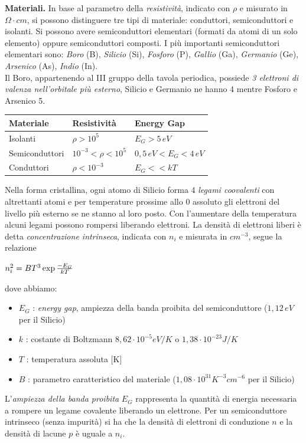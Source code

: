 \documentclass[a4paper,portrait,12pt]{article}
\theoremstyle{definition}
\begin{document}
\textbf{Materiali.} In base al parametro della \textit{resistività}, indicato con
$\rho$ e misurato in $\Omega \cdot cm$, si possono distinguere tre tipi di materiale: conduttori, 
semiconduttori e isolanti.
Si possono avere semiconduttori elementari (formati da atomi di un solo elemento) oppure semiconduttori 
composti. I più importanti semiconduttori elementari sono:
\textit{Boro} (B), \textit{Silicio} (Si), \textit{Fosforo} (P), \textit{Gallio} (Ga), \textit{Germanio} 
(Ge), \textit{Arsenico} (As), \textit{Indio} (In).\\Il Boro, appartenendo al III gruppo della tavola 
periodica, possiede \textit{3 elettroni di valenza nell'orbitale più esterno}, Silicio e Germanio ne 
hanno 4 mentre Fosforo e Arsenico 5.

\begin{table}[H]
\begin{center}
\begin{tabular}{|l|l|l|}
\hline
\hline Materiale & Resistività & Energy Gap\\
\hline 
\hline Isolanti & $\rho > 10^5$ & $E_G > 5\,eV$\\
\hline Semiconduttori & $ 10^{-3} < \rho < 10^5 $ & $ 0,5\,eV < E_G < 4\,eV$\\
\hline Conduttori & $ \rho < 10^{-3}$ & $E_G << kT$\\
\hline
\end{tabular}
\end{center}
\end{table} 

Nella forma cristallina, ogni atomo di Silicio forma 4 \textit{legami coovalenti} con altrettanti atomi e 
per temperature prossime allo 0 assoluto gli elettroni del livello più esterno se ne stanno al loro posto. 
Con l'aumentare della temperatura alcuni legami possono rompersi liberando elettroni. La densità di 
elettroni liberi è detta
\textit{concentrazione intrinseca}, indicata con $n_i$ e misurata in $cm^{-3}$, segue la relazione
\begin{center}
$n_i^2 = B T^3 \exp{-E_G \over k T}$
\end{center}
dove abbiamo:
\begin{itemize}
\item $E_G$ : \textit{energy gap}, ampiezza della banda proibita del semiconduttore ($1,12\,eV$ per il 
Silicio)
\item $k$ : costante di Boltzmann $8,62 \cdot 10^{-5} eV/K$ o  $1,38 \cdot 10^{-23} J/K$
\item $T$ : temperatura assoluta [K]
\item $B$ : parametro caratteristico del materiale ($1,08 \cdot 10^{31} K^{-3}cm^{-6}$ per il Silicio)
\end{itemize}
L'\textit{ampiezza della banda proibita} $E_G$ rappresenta la quantità di energia necessaria a rompere un 
legame covalente liberando un elettrone. Per un semiconduttore intrinseco (senza impurità) si ha che la 
densità di elettroni di conduzione $n$ e la densità di lacune $p$ è uguale a $n_i$.
\bigskip
\end{document}
